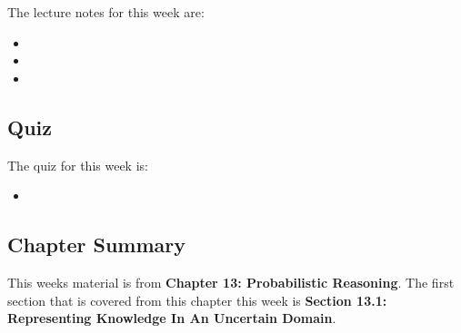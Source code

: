 \noindent The lecture notes for this week are:

\begin{itemize}
    \item {}
    \item {}
    \item {}
\end{itemize}

\subsection{Quiz}

The quiz for this week is:

\begin{itemize}
    \item {}
\end{itemize}

\subsection{Chapter Summary}

This weeks material is from \textbf{Chapter 13: Probabilistic Reasoning}. The first section that is covered from this chapter this week is \textbf{Section 13.1: Representing Knowledge In An Uncertain Domain}.

